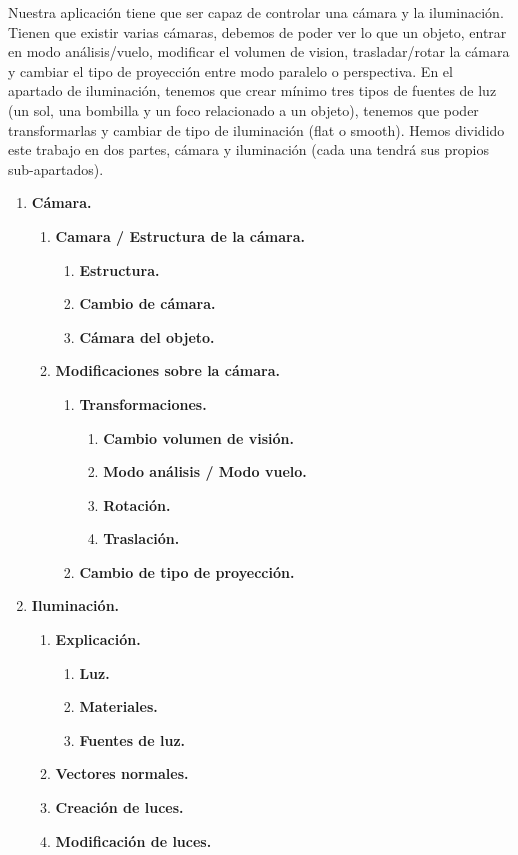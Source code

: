 \documentclass[12pt,a4paper]{article}
\begin{document}
Nuestra aplicación tiene que ser capaz de controlar una cámara y la iluminación.
Tienen que existir varias cámaras, debemos de poder ver lo que un objeto, entrar en modo análisis/vuelo, modificar el volumen de vision, trasladar/rotar la cámara y cambiar el tipo de proyección entre modo paralelo o perspectiva. En el apartado de iluminación, tenemos que crear mínimo tres tipos de fuentes de luz (un sol, una bombilla y un foco relacionado a un objeto), tenemos que poder transformarlas y cambiar de tipo de iluminación (flat o smooth).\newline
Hemos dividido este trabajo en dos partes, cámara y iluminación (cada una tendrá sus propios sub-apartados).
\begin{enumerate}
\item \textbf{Cámara.}
\begin{enumerate}
\item \textbf{Camara / Estructura de la cámara.}
\begin{enumerate}
\item \textbf{Estructura.}
\item \textbf{Cambio de cámara.}
\item \textbf{Cámara del objeto.}
\end{enumerate}
\item \textbf{Modificaciones sobre la cámara.}
\begin{enumerate}
\item \textbf{Transformaciones.}
\begin{enumerate}
\item \textbf{Cambio volumen de visión.}
\item \textbf{Modo análisis / Modo vuelo.}
\item \textbf{Rotación.}
\item \textbf{Traslación.}
\end{enumerate}
\item \textbf{Cambio de tipo de proyección.}
\end{enumerate}
\end{enumerate}

\item \textbf{Iluminación.}
\begin{enumerate}
\item \textbf{Explicación.}
\begin{enumerate}
\item \textbf{Luz.}
\item \textbf{Materiales.}
\item \textbf{Fuentes de luz.}
\end{enumerate}
\item \textbf{Vectores normales.}
\item \textbf{Creación de luces.}
\item \textbf{Modificación de luces.}
\end{enumerate}
\end{enumerate}
\end{document}
